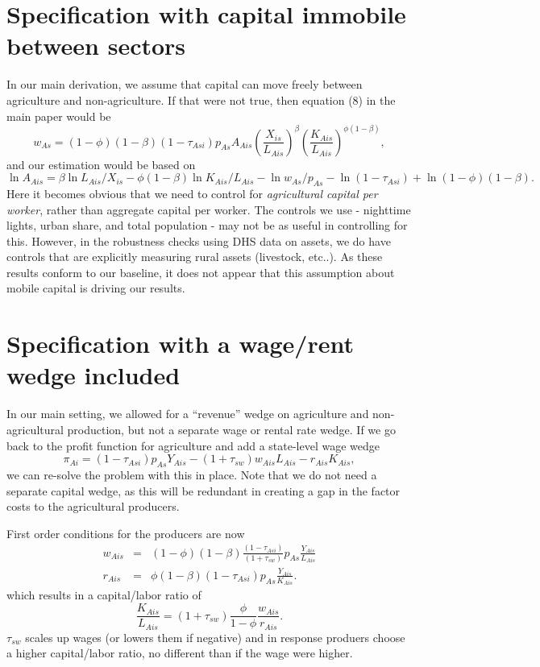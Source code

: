 \documentclass[11pt]{article}
\begin{document}
\section{Specification with capital immobile between sectors}
In our main derivation, we assume that capital can move freely between agriculture and non-agriculture. If that were not true, then equation (8) in the main paper would be
\begin{equation}
    w_{As} = (1-\phi)(1-\beta) (1-\tau_{Asi}) p_{As} A_{Ais} \left(\frac{X_{is}}{L_{Ais}}\right)^{\beta} \left(\frac{K_{Ais}}{L_{Ais}}\right)^{\phi(1-\beta)},
\end{equation}
and our estimation would be based on
\begin{equation}
    \ln A_{Ais} = \beta \ln L_{Ais}/X_{is} - \phi(1-\beta) \ln K_{Ais}/L_{Ais} - \ln w_{As}/p_{As} - \ln (1-\tau_{Asi}) + \ln (1-\phi)(1-\beta).
\end{equation}
Here it becomes obvious that we need to control for \textit{agricultural capital per worker}, rather than aggregate capital per worker. The controls we use - nighttime lights, urban share, and total population - may not be as useful in controlling for this. However, in the robustness checks using DHS data on assets, we do have controls that are explicitly measuring rural assets (livestock, etc..). As these results conform to our baseline, it does not appear that this assumption about mobile capital is driving our results. 

\section{Specification with a wage/rent wedge included}
In our main setting, we allowed for a ``revenue'' wedge on agriculture and non-agricultural production, but not a separate wage or rental rate wedge. If we go back to the profit function for agriculture and add a state-level wage wedge
\begin{equation}
    \pi_{Ai} = (1-\tau_{Asi}) p_{As} Y_{Ais} - (1+\tau_{sw}) w_{Ais} L_{Ais} - r_{Ais} K_{Ais},
\end{equation}
we can re-solve the problem with this in place. Note that we do not need a separate capital wedge, as this will be redundant in creating a gap in the factor costs to the agricultural producers. 

First order conditions for the producers are now
\begin{eqnarray}
    w_{Ais} &=& (1-\phi)(1-\beta) \frac{(1-\tau_{Asi})}{(1+\tau_{sw})} p_{As} \frac{Y_{Ais}}{L_{Ais}} \\ \nonumber 
    r_{Ais} &=& \phi(1-\beta) (1-\tau_{Asi}) p_{As} \frac{Y_{Ais}}{K_{Ais}}. \label{EQ_factorprices}
\end{eqnarray}
which results in a capital/labor ratio of
\begin{equation}
    \frac{K_{Ais}}{L_{Ais}} = (1+\tau_{sw}) \frac{\phi}{1-\phi} \frac{w_{Ais}}{r_{Ais}}. \label{EQ_KLag}
\end{equation}
$\tau_{sw}$ scales up wages (or lowers them if negative) and in response produers choose a higher capital/labor ratio, no different than if the wage were higher. 
\end{document}
